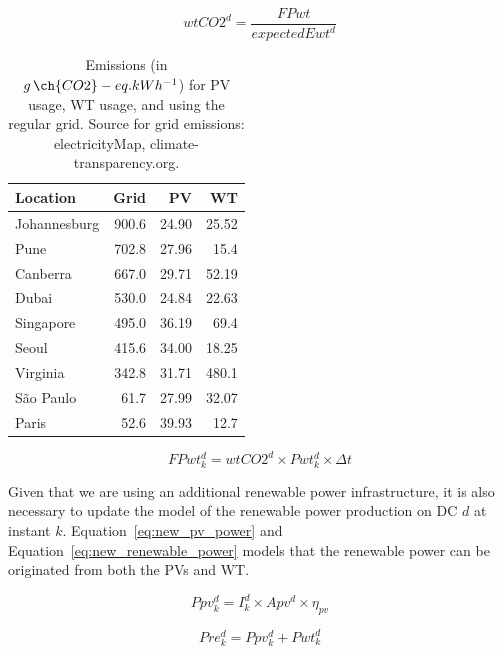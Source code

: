 \begin{equation} 
   wtCO2^d =  \frac{FPwt}{expectedEwt^d} 
\end{equation}

\begin{table}[H]
\caption{Emissions (in $g\,\ch{CO2}-eq.kWh^{-1}$) for PV usage, WT usage, and using the regular grid. Source for grid emissions: electricityMap, climate-transparency.org.}\label{tab:co2_pv_wt_grid} \centering

  \begin{tabular}{|l|r|r|r|}
    
  \hline

  \textbf{Location} &  \textbf{Grid} & \textbf{PV} & \textbf{WT} \\
  \hline
  Johannesburg & 900.6 & 24.90  & 25.52 \\
  \hline
  Pune & 702.8 & 27.96  & 15.4 \\
  \hline
  Canberra & 667.0 & 29.71 & 52.19\\
  \hline
  Dubai & 530.0  & 24.84 & 22.63 \\
  \hline
  Singapore & 495.0 & 36.19 & 69.4\\
  \hline     
  Seoul & 415.6 & 34.00 & 18.25 \\
  \hline
  Virginia  & 342.8 & 31.71 & 480.1 \\
  \hline
  São Paulo &  61.7 & 27.99 & 32.07 \\
  \hline 
  Paris &  52.6  & 39.93 & 12.7 \\
  \hline  


\end{tabular}  
\end{table}


\begin{equation}\label{eq:fp_using_wt}
   FPwt^d_k =  wtCO2^d \times Pwt^d_{k}\times \Delta t
\end{equation}


Given that we are using an additional renewable power infrastructure, it is also necessary to update the model of the renewable power production on DC $d$ at instant $k$. Equation~\eqref{eq:new_pv_power} and Equation~\eqref{eq:new_renewable_power} models that the renewable power can be originated from both the PVs and WT.

\begin{equation} \label{eq:new_pv_power}
    Ppv^d_{k}= I^d_k \times Apv^d \times \eta_{pv}
\end{equation}


\begin{equation} \label{eq:new_renewable_power}
    Pre^d_{k}= Ppv^d_{k} + Pwt^d_{k}
\end{equation}

